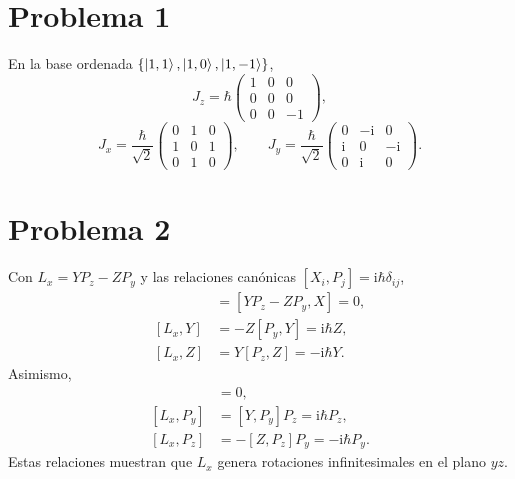 \documentclass[11pt,a4paper]{article}
\numberwithin{equation}{section}
\renewcommand{\boxed}[1]{#1}
\newcommand{\ii}{\mathrm i}
\newcommand{\hb}{\hbar}
\begin{document}
\section{Problema 1}
En la base ordenada $\{\ket{1,1},\ket{1,0},\ket{1,-1}\}$,
\begin{equation}
\boxed{J_z=\hb\begin{pmatrix}1&0&0\\0&0&0\\0&0&-1\end{pmatrix},}
\end{equation}
\begin{equation}
\boxed{J_x=\frac{\hb}{\sqrt2}
\begin{pmatrix}0&1&0\\1&0&1\\0&1&0\end{pmatrix},\qquad
J_y=\frac{\hb}{\sqrt2}
\begin{pmatrix}0&-\ii&0\\\ii&0&-\ii\\0&\ii&0\end{pmatrix}.}
\end{equation}

\section{Problema 2}
Con $L_x=YP_z-ZP_y$ y las relaciones canónicas $[X_i,P_j]=\ii\hb\delta_{ij}$,
\begin{align}
[L_x,X]&=[YP_z-ZP_y,X]=0,\\
[L_x,Y]&=-Z[P_y,Y]=\ii\hb Z,\\
[L_x,Z]&=Y[P_z,Z]=-\ii\hb Y.
\end{align}
Asimismo,
\begin{align}
[L_x,P_x]&=0,\\
[L_x,P_y]&=[Y,P_y]P_z=\ii\hb P_z,\\
[L_x,P_z]&=-[Z,P_z]P_y=-\ii\hb P_y.
\end{align}
Estas relaciones muestran que $L_x$ genera rotaciones infinitesimales en el plano $yz$.
\end{document}
